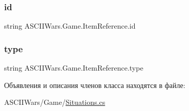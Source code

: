 \hypertarget{class_a_s_c_i_i_wars_1_1_game_1_1_item_reference_aefee1e2d5dac90be31ad4a9a3ee6fba2}{}\label{class_a_s_c_i_i_wars_1_1_game_1_1_item_reference_aefee1e2d5dac90be31ad4a9a3ee6fba2} 
\subsubsection{\texorpdfstring{id}{id}}
{\footnotesize\ttfamily string A\+S\+C\+I\+I\+Wars.\+Game.\+Item\+Reference.\+id}

\hypertarget{class_a_s_c_i_i_wars_1_1_game_1_1_item_reference_a7aeb379f2178fed498bd782a01888de3}{}\label{class_a_s_c_i_i_wars_1_1_game_1_1_item_reference_a7aeb379f2178fed498bd782a01888de3} 
\subsubsection{\texorpdfstring{type}{type}}
{\footnotesize\ttfamily string A\+S\+C\+I\+I\+Wars.\+Game.\+Item\+Reference.\+type}



Объявления и описания членов класса находятся в файле\+:\begin{DoxyCompactItemize}
\item 
A\+S\+C\+I\+I\+Wars/\+Game/\hyperlink{_situations_8cs}{Situations.\+cs}\end{DoxyCompactItemize}
